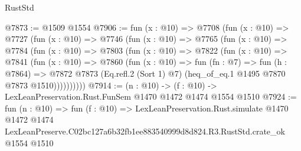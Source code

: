 \begin{lexlean}{RustStd}
\begin{coremodule}
@7873 := @1509 @1554
@7906 := fun (x : @10) =>
  @7708
    (fun (x : @10) =>
    @7727
      (fun (x : @10) =>
      @7746
        (fun (x : @10) =>
        @7765
          (fun (x : @10) =>
          @7784
            (fun (x : @10) =>
            @7803
              (fun (x : @10) =>
              @7822
                (fun (x : @10) =>
                @7841
                  (fun (x : @10) =>
                  @7860
                    (fun (x : @10) =>
                    fun (fn : @7) =>
                    fun (h : @7864) =>
                    @7872
                      @7873
                      (Eq.refl.{2} (Sort 1) @7)
                      (heq_of_eq.{1} @1495 @7870 @7873 @1510))))))))))
@7914 := (n : @10) -> (f : @10) -> LexLeanPreservation.Rust.FunSem @1470 @1472 @1474 @1554 @1510
@7924 := fun (n : @10) =>
  fun (f : @10) =>
  LexLeanPreservation.Rust.simulate
    @1470
    @1472
    @1474
    LexLeanPreserve.C02bc127a6b32fb1ee883540999d8d824.R3.RustStd.crate_ok
    @1554
    @1510
\end{coremodule}
\end{lexlean}
